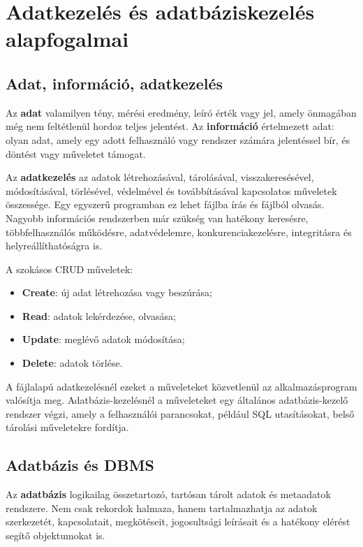 \section{Adatkezelés és adatbáziskezelés alapfogalmai}

\subsection{Adat, információ, adatkezelés}

Az \textbf{adat} valamilyen tény, mérési eredmény, leíró érték vagy jel, amely önmagában még nem feltétlenül hordoz teljes jelentést. Az \textbf{információ} értelmezett adat: olyan adat, amely egy adott felhasználó vagy rendszer számára jelentéssel bír, és döntést vagy műveletet támogat.

Az \textbf{adatkezelés} az adatok létrehozásával, tárolásával, visszakeresésével, módosításával, törlésével, védelmével és továbbításával kapcsolatos műveletek összessége. Egy egyszerű programban ez lehet fájlba írás és fájlból olvasás. Nagyobb információs rendszerben már szükség van hatékony keresésre, többfelhasználós működésre, adatvédelemre, konkurenciakezelésre, integritásra és helyreállíthatóságra is.

A szokásos CRUD műveletek:

\begin{itemize}
  \item \textbf{Create}: új adat létrehozása vagy beszúrása;
  \item \textbf{Read}: adatok lekérdezése, olvasása;
  \item \textbf{Update}: meglévő adatok módosítása;
  \item \textbf{Delete}: adatok törlése.
\end{itemize}

A fájlalapú adatkezelésnél ezeket a műveleteket közvetlenül az alkalmazásprogram valósítja meg. Adatbázis-kezelésnél a műveleteket egy általános adatbázis-kezelő rendszer végzi, amely a felhasználói parancsokat, például SQL utasításokat, belső tárolási műveletekre fordítja.

\subsection{Adatbázis és DBMS}

Az \textbf{adatbázis} logikailag összetartozó, tartósan tárolt adatok és metaadatok rendszere. Nem csak rekordok halmaza, hanem tartalmazhatja az adatok szerkezetét, kapcsolatait, megkötéseit, jogosultsági leírásait és a hatékony elérést segítő objektumokat is.

